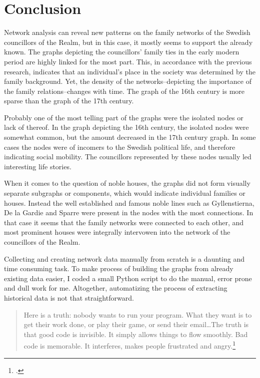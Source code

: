 \section{Conclusion}
Network analysis can reveal new patterns on the family networks of the Swedish councillors of the Realm, but in this case, it mostly seems to support the already known. The graphs depicting the councillors' family ties in the early modern period are highly linked for the most part. This, in accordance with the previous research, indicates that an individual's place in the society was determined by the family background. Yet, the density of the networks–depicting the importance of the family relations–changes with time. The graph of the 16th century is more sparse than the graph of the 17th century.

Probably one of the most telling part of the graphs were the isolated nodes or lack of thereof. In the graph depicting the 16th century, the isolated nodes were somewhat common, but the amount decreased in the 17th century graph. In some cases the nodes were of incomers to the Swedish political life, and therefore indicating social mobility. The councillors represented by these nodes usually led interesting life stories.

When it comes to the question of noble houses, the graphs did not form visually separate subgraphs or components, which would indicate individual families or houses. Instead the well established and famous noble lines such as Gyllenstierna, De la Gardie and Sparre were present in the nodes with the most connections. In that case it seems that the family networks were connected to each other, and most prominent houses were integrally intervowen into the network of the councillors of the Realm.

Collecting and creating network data manually from scratch is a daunting and time consuming task. To make process of building the graphs from already existing data easier, I coded a small Python script to do the manual, error prone and dull work for me. Altogether, automatizing the process of extracting historical data is not that straightforward.

\begin{quote}
	Here is a truth: nobody wants to run your program. What they want is to get their work done, or play their game, or send their email\ldots The truth is that good code is invisible. It simply allows things to flow smoothly. Bad code is memorable. It interferes, makes people frustrated and angry.\footcite[prefix p. XVI]{python}
\end{quote}


